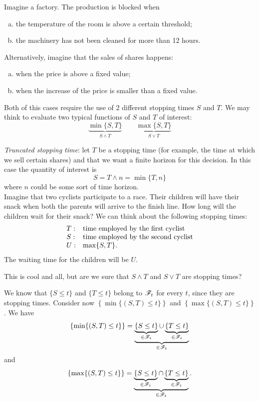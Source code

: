 \documentclass{report}
\begin{document}
\begin{example}
Imagine a factory. The production is blocked when
\begin{enumerate}[a)]
	\item the temperature of the room is above a certain threshold; 
	\item the machinery has not been cleaned for more than 12 hours.
\end{enumerate}\par
Alternatively, imagine that the sales of shares happens:
\begin{enumerate}[a)]
	\item when the price is above a fixed value;
	\item when the increase of the price is smaller than a fixed value.
\end{enumerate}
\end{example}
Both of this cases require the use of 2 different stopping times $S$ and $T$. We may think to evaluate two typical functions of $S$ and $T$ of interest:
\begin{equation*}
	\underbrace{\min\{S,T\}}_{S\wedge T}\qquad	\underbrace{\max\{S,T\}}_{S\vee T}
\end{equation*}
\begin{example}
	\emph{Truncated stopping time}: let $T$ be a stopping time (for example, the time at which we sell certain shares) and that we want a finite horizon for this decision. In this case the quantity of interest is
	\begin{equation*}
		S=T\wedge n=\min\{T,n\}
	\end{equation*}
	where $n$ could be some sort of time horizon.\\
	Imagine that two cyclists participate to a race. Their children will have their snack when both the parents will arrive to the finish line. How long will the children wait for their snack?
	We can think about the following stopping times:
\[ 	\begin{array}{l l}
		T: & \text{time employed by the first cyclist}\\
	S: & \text{time employed by the second cyclist}\\
	U: &\max\{S,T\}.
		
	\end{array} \]
	The waiting time for the children will be $U$.
\end{example}
This is cool and all, but are we sure that $S\wedge T$ and $S\vee T$ are stopping times?
\begin{fancyproof}
	We know that $\{S\leq t\}$ and $\{T\leq t\}$ belong to $\mathscr{F}_t$ for every $t$, since they are stopping times. Consider now $\left\{\min\{(S,T)\leq t\}\right\}$ and $\left\{\max\{(S,T)\leq t\}\right\}$. We have
	\begin{equation*}
		\left\{\min\{(S,T)\leq t\}\right\}=\underbrace{\underbrace{\{S\leq t\}}_{\in\mathscr{F}_t}\cup\underbrace{\{T\leq t\}}_{\in\mathscr{F}_t}}_{\in\mathscr{F}_t}
	\end{equation*}
	and 
	\begin{equation*}
			\left\{\max\{(S,T)\leq t\}\right\}=\underbrace{\underbrace{\{S\leq t\}}_{\in\mathscr{F}_t}\cap\underbrace{\{T\leq t\}}_{\in\mathscr{F}_t}}_{\in\mathscr{F}_t}.
	\end{equation*}
\end{fancyproof}
\end{document}
